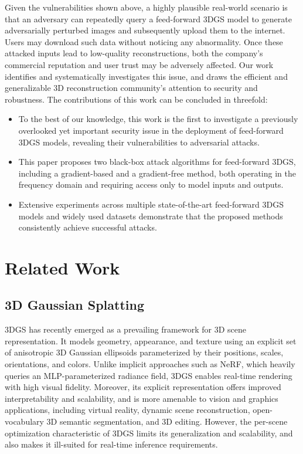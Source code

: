 \documentclass[runningheads]{llncs}
\begin{document}
Given the vulnerabilities shown above, a highly plausible real-world scenario is that an adversary can repeatedly query a feed-forward 3DGS model to generate adversarially perturbed images and subsequently upload them to the internet. Users may download such data without noticing any abnormality. Once these attacked inputs lead to low-quality reconstructions, both the company’s commercial reputation and user trust may be adversely affected. Our work identifies and systematically investigates this issue, and draws the efficient and generalizable 3D reconstruction community’s attention to security and robustness. The contributions of this work can be concluded in threefold:
\begin{itemize}
    \item To the best of our knowledge, this work is the first to investigate a previously overlooked yet important security issue in the deployment of feed-forward 3DGS models, revealing their vulnerabilities to adversarial attacks.
    \item This paper proposes two black-box attack algorithms for feed-forward 3DGS, including a gradient-based and a gradient-free method, both operating in the frequency domain and requiring access only to model inputs and outputs.
    \item Extensive experiments across multiple state-of-the-art feed-forward 3DGS models and widely used datasets demonstrate that the proposed methods consistently achieve successful attacks.
\end{itemize}

\section{Related Work}

\subsection{3D Gaussian Splatting}
3DGS\cite{kerbl20233d} has recently emerged as a prevailing framework for 3D scene representation. It models geometry, appearance, and texture using an explicit set of anisotropic 3D Gaussian ellipsoids parameterized by their positions, scales, orientations, and colors. Unlike implicit approaches such as NeRF\cite{mildenhall2021nerf}, which heavily queries an MLP-parameterized radiance field, 3DGS enables real-time rendering with high visual fidelity. Moreover, its explicit representation offers improved interpretability and scalability, and is more amenable to vision and graphics applications, including virtual reality\cite{jiang2024vr,tu2024fast}, dynamic scene reconstruction\cite{yang2023real,yang2024deformable,wu20244d}, open-vocabulary 3D semantic segmentation\cite{wu2024opengaussian,qin2024langsplat,shi2024language,ye2024gaussian,lu2025segment}, and 3D editing\cite{qu2025drag,dong20263dgs,yan20243dsceneeditor}. However, the per-scene optimization characteristic of 3DGS limits its generalization and scalability, and also makes it ill-suited for real-time inference requirements.
\end{document}
